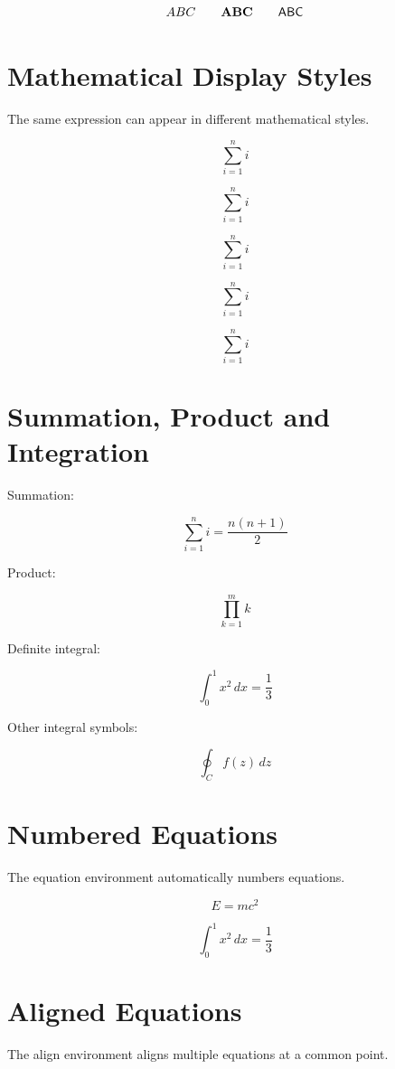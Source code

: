 \documentclass{article}
\begin{document}
\[
\mathnormal{ABC} \qquad
\mathbf{ABC} \qquad
\mathsf{ABC}
\]

\section{Mathematical Display Styles}

The same expression can appear in different mathematical styles.

\[
\sum_{i=1}^{n} i
\]

\[
\displaystyle \sum_{i=1}^{n} i
\]

\[
\textstyle \sum_{i=1}^{n} i
\]

\[
\scriptstyle \sum_{i=1}^{n} i
\]

\[
\scriptscriptstyle \sum_{i=1}^{n} i
\]

\section{Summation, Product and Integration}

Summation:

\[
\sum_{i=1}^{n} i = \frac{n(n+1)}{2}
\]

Product:

\[
\prod_{k=1}^{m} k
\]

Definite integral:

\[
\int_{0}^{1} x^2 \, dx = \frac{1}{3}
\]

Other integral symbols:

\[
\oint_C f(z)\,dz
\]


\section{Numbered Equations}

The equation environment automatically numbers equations.

\begin{equation}
    E = mc^2
\end{equation}

\begin{equation}
    \int_0^1 x^2 \, dx = \frac{1}{3}
\end{equation}

\section{Aligned Equations}

The align environment aligns multiple equations
at a common point.
\end{document}
